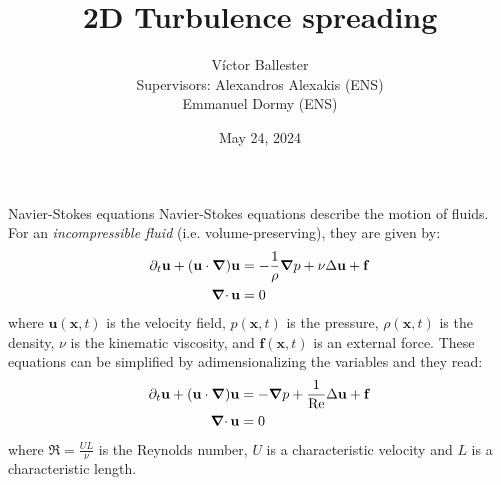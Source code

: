\documentclass{beamer} %
\title{2D Turbulence spreading}
\author{
	Víctor Ballester\texorpdfstring{\vspace{0.45cm}\\}{}{\small Supervisors: Alexandros Alexakis (ENS)\\
\qquad\qquad\; Emmanuel Dormy (ENS)}}
\date{May 24, 2024}
\begin{document}
\thispagestyle{empty}
\frame{\titlepage}
\begin{frame}{Navier-Stokes equations}
	Navier-Stokes equations describe the motion of fluids. For an \emph{incompressible fluid} (i.e. volume-preserving), they are given by:
	\begin{align*}
		\partial_t \mathbf{u} + (\mathbf{u} \cdot \grad) \mathbf{u} & = -\frac{1}{\rho}\grad p + \nu \Delta \mathbf{u} + \mathbf{f} \\
		\operatorname{\boldsymbol{\mathrm{\nabla}}\cdot} \mathbf{u}                                            & = 0
	\end{align*}
	where $\mathbf{u}(\mathbf{x},t)$ is the velocity field, $p(\mathbf{x},t)$ is the pressure, $\rho(\mathbf{x},t)$ is the density, $\nu$ is the kinematic viscosity, and $\mathbf{f}(\mathbf{x},t)$ is an external force. These equations can be simplified by adimensionalizing the variables and they read:
	\begin{align*}
		\partial_t \mathbf{u} + (\mathbf{u} \cdot \grad) \mathbf{u} & = -\grad p + \frac{1}{\Re}\Delta \mathbf{u} + \mathbf{f} \\
		\operatorname{\boldsymbol{\mathrm{\nabla}}\cdot} \mathbf{u}                                            & = 0
	\end{align*}
	where $\Re=\frac{UL}{\nu}$ is the Reynolds number, $U$ is a characteristic velocity and $L$ is a characteristic length.
\end{frame}
\end{document}
